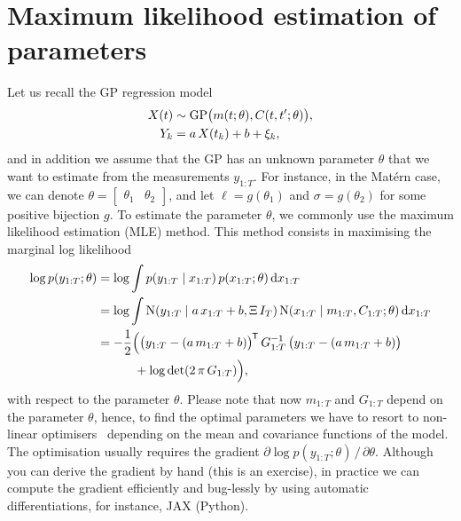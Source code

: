 \documentclass[]{article}
\begin{document}
\section{Maximum likelihood estimation of parameters}
Let us recall the GP regression model
%
\begin{equation}
	\begin{split}
		X(t) &\sim \mathrm{GP}\bigl( m(t; \theta), C(t, t'; \theta) \bigr), \\
		Y_k &= a \, X(t_k) + b + \xi_k,
		\label{equ:gp-para-est}
	\end{split}
\end{equation}
and in addition we assume that the GP has an unknown parameter $\theta$ that we want to estimate from the measurements $y_{1:T}$. For instance, in the Mat\'{e}rn case, we can denote $\theta = \begin{bmatrix} \theta_1 & \theta_2 \end{bmatrix}$, and let $\ell = g(\theta_1)$ and $\sigma = g(\theta_2)$ for some positive bijection $g$. To estimate the parameter $\theta$, we commonly use the maximum likelihood estimation (MLE) method. This method consists in maximising the marginal log likelihood
%
\begin{equation*}
	\begin{split}
		\log p(y_{1:T}; \theta) &= \log \int p(y_{1:T} {\;|\;} x_{1:T}) \, p(x_{1:T}; \theta) \mathop{}\!\mathrm{d} x_{1:T} \\
		&= \log \int \mathrm{N}(y_{1:T} {\;|\;} a \, x_{1:T} + b, \Xi \, I_T) \, \mathrm{N}(x_{1:T} {\;|\;} m_{1:T}, C_{1:T}; \theta) \mathop{}\!\mathrm{d} x_{1:T} \\
		&= -\frac{1}{2} \Bigl(\bigl(y_{1:T} - (a \, m_{1:T} + b)\bigr)^{\mkern-1.5mu\mathsf{T}} \, G_{1:T}^{-1} \, \bigl(y_{1:T} - (a \, m_{1:T} + b)\bigr) \\
		&\qquad\quad+ \log \det(2 \, \pi \, G_{1:T})\Bigr),
	\end{split}
\end{equation*}
%
with respect to the parameter $\theta$. Please note that now $m_{1:T}$ and $G_{1:T}$ depend on the parameter $\theta$, hence, to find the optimal parameters we have to resort to non-linear optimisers~\citep{Nocedal2006} depending on the mean and covariance functions of the model. The optimisation usually requires the gradient $\partial \log p(y_{1:T}; \theta) \, / \, \partial \theta$. Although you can derive the gradient by hand (this is an exercise), in practice we can compute the gradient efficiently and bug-lessly by using automatic differentiations, for instance, JAX (Python).
\end{document}
